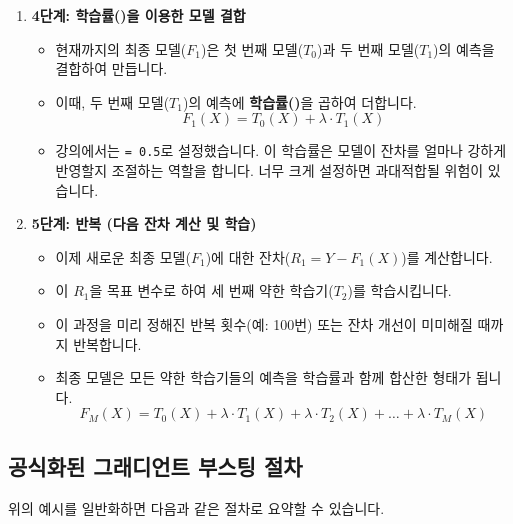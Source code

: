 \documentclass[11pt,a4paper]{article}
\theoremstyle{definition}
\begin{document}
\begin{tcolorbox}[example, title={회귀 문제 예시}]
\begin{enumerate}
    \item \textbf{4단계: 학습률(\texttt{\lambda})을 이용한 모델 결합}
    \begin{itemize}
        \item 현재까지의 최종 모델($F_1$)은 첫 번째 모델($T_0$)과 두 번째 모델($T_1$)의 예측을 결합하여 만듭니다.
        \item 이때, 두 번째 모델($T_1$)의 예측에 \textbf{학습률(\texttt{\lambda})}을 곱하여 더합니다.
        \[ F_1(X) = T_0(X) + \lambda \cdot T_1(X) \]
        \item 강의에서는 \texttt{\lambda = 0.5}로 설정했습니다. 이 학습률은 모델이 잔차를 얼마나 강하게 반영할지 조절하는 역할을 합니다. 너무 크게 설정하면 과대적합될 위험이 있습니다.
    \end{itemize}

    \item \textbf{5단계: 반복 (다음 잔차 계산 및 학습)}
    \begin{itemize}
        \item 이제 새로운 최종 모델($F_1$)에 대한 잔차($R_1 = Y - F_1(X)$)를 계산합니다.
        \item 이 $R_1$을 목표 변수로 하여 세 번째 약한 학습기($T_2$)를 학습시킵니다.
        \item 이 과정을 미리 정해진 반복 횟수(예: 100번) 또는 잔차 개선이 미미해질 때까지 반복합니다.
        \item 최종 모델은 모든 약한 학습기들의 예측을 학습률과 함께 합산한 형태가 됩니다.
        \[ F_M(X) = T_0(X) + \lambda \cdot T_1(X) + \lambda \cdot T_2(X) + \dots + \lambda \cdot T_M(X) \]
    \end{itemize}
\end{enumerate}
\end{tcolorbox}

\subsection{공식화된 그래디언트 부스팅 절차}
위의 예시를 일반화하면 다음과 같은 절차로 요약할 수 있습니다.
\end{document}
